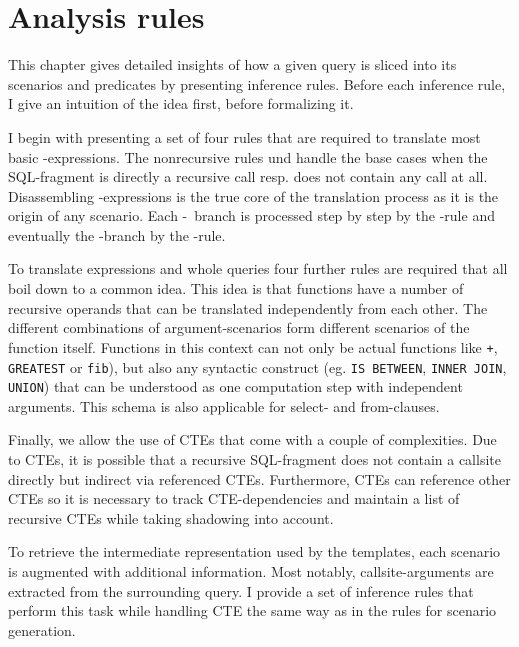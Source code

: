 \chapter{Analysis rules}\label{chapter:analysis}


This chapter gives detailed insights of how a given query is sliced into its scenarios and predicates by presenting inference rules. Before each inference rule, I give an intuition of the idea first, before formalizing it.

I begin with presenting a set of four rules that are required to translate most basic \CASE-expressions. The nonrecursive rules \RREC und \RBASE handle the base cases when the SQL-fragment is directly a recursive call resp. does not contain any call at all. Disassembling \CASE-expressions is the true core of the translation process as it is the origin of any scenario. Each \WHEN-\THEN~branch is processed step by step by the \RWHEN-rule and eventually the \ELSE-branch by the \RELSE-rule.

To translate expressions and whole queries four further rules are required that all boil down to a common idea. This idea is that functions have a number of recursive operands that can be translated independently from each other. The different combinations of argument-scenarios form different scenarios of the function itself. Functions in this context can not only be actual functions like \texttt{+}, \texttt{GREATEST} or \texttt{fib}), but also any syntactic construct (eg. \texttt{IS BETWEEN}, \texttt{INNER JOIN}, \texttt{UNION}) that can be understood as one computation step with independent arguments. This schema is also applicable for select- and from-clauses.

Finally, we allow the use of CTEs that come with a couple of complexities. Due to CTEs, it is possible that a recursive SQL-fragment does not contain a callsite directly but indirect via referenced CTEs. Furthermore, CTEs can reference other CTEs so it is necessary to track CTE-dependencies and maintain a list of recursive CTEs while taking shadowing into account.

To retrieve the intermediate representation used by the templates, each scenario is augmented with additional information. Most notably, callsite-arguments are extracted from the surrounding query. I provide a set of inference rules that perform this task while handling CTE the same way as in the rules for scenario generation.


